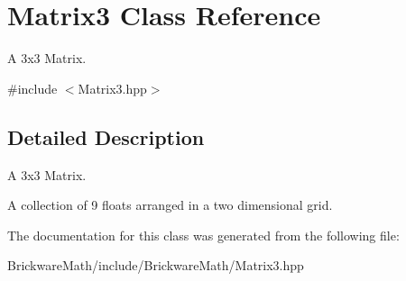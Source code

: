 \hypertarget{classMatrix3}{}\section{Matrix3 Class Reference}
\label{classMatrix3}


A 3x3 Matrix.  




{\ttfamily \#include $<$Matrix3.\+hpp$>$}



\subsection{Detailed Description}
A 3x3 Matrix. 

A collection of 9 floats arranged in a two dimensional grid. 

The documentation for this class was generated from the following file\+:\begin{DoxyCompactItemize}
\item 
Brickware\+Math/include/\+Brickware\+Math/Matrix3.\+hpp\end{DoxyCompactItemize}
